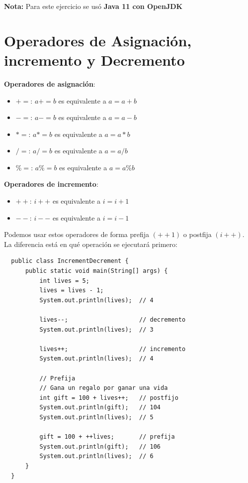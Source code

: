 \documentclass{article}
\begin{document}
\textbf{Nota:} Para este ejercicio se usó \textbf{Java 11 con OpenJDK}


\section{Operadores de Asignación, incremento y Decremento}%
\textbf{Operadores de asignación}:\\
\begin{itemize}
  \item \textbf{$+=$}: $a += b$ es equivalente a $a = a + b$
  \item \textbf{$-=$}: $a -= b$ es equivalente a $a = a - b$
  \item \textbf{$*=$}: $a *= b$ es equivalente a $a = a * b$
  \item \textbf{$/=$}: $a /= b$ es equivalente a $a = a / b$
  \item \textbf{$\%=$}: $a \%= b$ es equivalente a $a = a \% b$
\end{itemize}

\textbf{Operadores de incremento}:\\
\begin{itemize}
  \item \textbf{$++$}: $i++$ es equivalente a $i = i + 1$
  \item \textbf{$--$}: $i--$ es equivalente a $i = i - 1$
\end{itemize}

Podemos usar estos operadores de forma prefija $(++1)$ o postfija $(i++)$. La
diferencia está en qué operación se ejecutará primero:

\begin{verbatim}
  public class IncrementDecrement {
      public static void main(String[] args) {
          int lives = 5;
          lives = lives - 1;
          System.out.println(lives);  // 4

          lives--;                    // decremento
          System.out.println(lives);  // 3

          lives++;                    // incremento
          System.out.println(lives);  // 4

          // Prefija
          // Gana un regalo por ganar una vida
          int gift = 100 + lives++;   // postfijo
          System.out.println(gift);   // 104
          System.out.println(lives);  // 5

          gift = 100 + ++lives;       // prefija
          System.out.println(gift);   // 106
          System.out.println(lives);  // 6
      }
  }
\end{verbatim}
\end{document}
